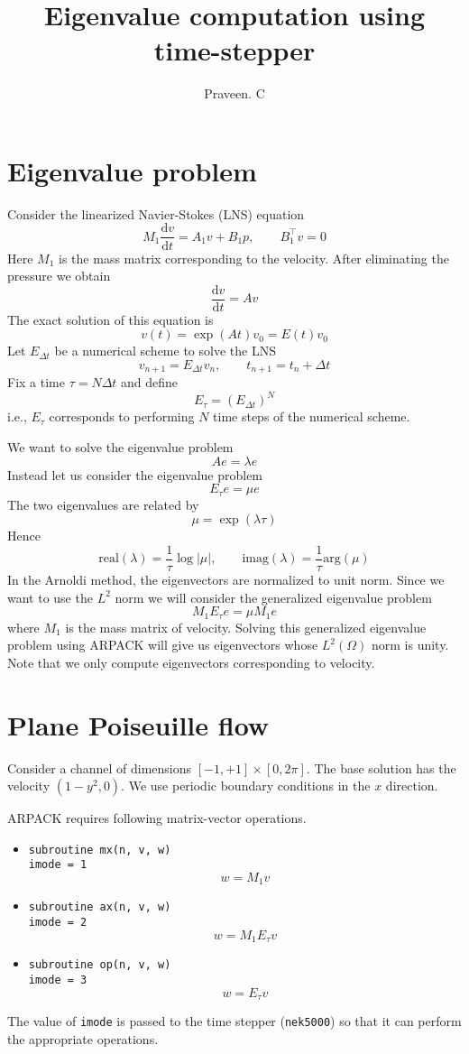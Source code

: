 \documentclass[12pt, oneside]{article}   	%
\title{Eigenvalue computation using time-stepper}
\author{Praveen. C}
\newcommand{\ud}{\textrm{d}}
\newcommand{\dd}[2]{\frac{\ud #1}{\ud #2}}
\newcommand{\Edt}{E_{\Delta t}}
\begin{document}
\maketitle
\section{Eigenvalue problem}
Consider the linearized Navier-Stokes (LNS) equation
\[
M_1 \dd{v}{t} = A_1 v + B_1 p, \qquad B_1^\top v = 0
\]
Here $M_1$ is the mass matrix corresponding to the velocity. After eliminating the pressure we obtain
\[
\dd{v}{t} = Av
\]
The exact solution of this equation is
\[
v(t) = \exp(A t) v_0 = E(t) v_0
\]
Let $\Edt$ be a numerical scheme to solve the LNS
\[
v_{n+1} = \Edt v_n, \qquad t_{n+1} = t_n + \Delta t
\]
Fix a time $\tau = N\Delta t$ and define
\[
E_\tau = (\Edt)^N
\]
i.e., $E_\tau$ corresponds to performing $N$ time steps of the numerical scheme.

We want to solve the eigenvalue problem
\[
A e = \lambda e
\]
Instead let us consider the eigenvalue problem
\[
E_\tau e = \mu e
\]
The two eigenvalues are related by
\[
\mu = \exp(\lambda \tau)
\]
Hence
\[
\textrm{real}(\lambda) = \frac{1}{\tau} \log|\mu|, \qquad \textrm{imag}(\lambda) = \frac{1}{\tau} \textrm{arg}(\mu)
\]
In the Arnoldi method, the eigenvectors are normalized to unit norm. Since we want to use the $L^2$ norm we will consider the generalized eigenvalue problem
\[
M_1 E_\tau e = \mu M_1 e
\]
where $M_1$ is the mass matrix of velocity. Solving this generalized eigenvalue problem using ARPACK will give us eigenvectors whose $L^2(\Omega)$ norm is unity. Note that we only compute eigenvectors corresponding to velocity.

\section{Plane Poiseuille flow}
Consider a channel of dimensions $[-1,+1] \times [0, 2\pi]$. The base solution has the velocity $(1-y^2, 0)$. We use periodic boundary conditions in the $x$ direction.

ARPACK requires following matrix-vector operations.

\begin{itemize}

\item {\tt subroutine mx(n, v, w)} \\
{\tt imode = 1}\\
\[
w = M_1 v
\]

\item {\tt subroutine ax(n, v, w)}\\
{\tt imode = 2}
\[
w = M_1 E_\tau v
\]

\item {\tt subroutine op(n, v, w)}\\
{\tt imode = 3}
\[
w = E_\tau v
\]

\end{itemize}

The value of {\tt imode} is passed to the time stepper ({\tt nek5000}) so that it can perform the appropriate operations.
\end{document}
